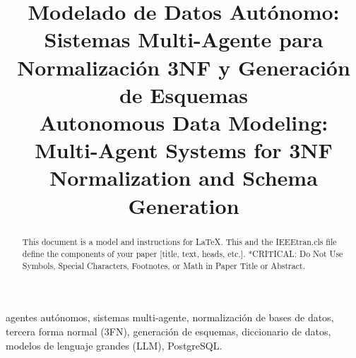 \documentclass[conference]{IEEEtran}
\begin{document}
\title{Modelado de Datos Autónomo: Sistemas Multi-Agente para Normalización 3NF y Generación de Esquemas\\
{\footnotesize Autonomous Data Modeling: Multi-Agent Systems for 3NF Normalization and Schema Generation}
}

\author{
\and
{}
\and
{}

}

\maketitle

\begin{abstract}
This document is a model and instructions for \LaTeX.
This and the IEEEtran.cls file define the components of your paper [title, text, heads, etc.]. *CRITICAL: Do Not Use Symbols, Special Characters, Footnotes,
or Math in Paper Title or Abstract.
\end{abstract}

\begin{IEEEkeywords}
agentes autónomos, sistemas multi-agente, normalización de bases de datos, tercera forma normal (3FN), generación de esquemas, diccionario de datos, modelos de lenguaje grandes (LLM), PostgreSQL.
\end{IEEEkeywords}
\end{document}
